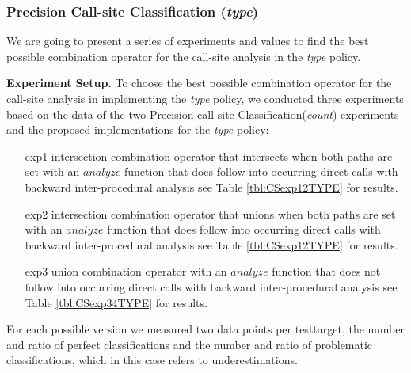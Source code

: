 %	
%
%
%
\newpage
\subsubsection{Precision Call-site Classification (\textit{type})}
\label{subsection:typeshieldprecision}
We are going to present a series of experiments and values to find the best possible combination operator for the call-site analysis in the \textit{type} policy.

\textbf{Experiment Setup.}
To choose the best possible combination operator for the call-site analysis in implementing the \textit{type} policy, we conducted three  experiments based on the data of the two Precision call-site Classification(\textit{count}) experiments and the proposed implementations for the \textit{type} policy:
\begin{itemize}
\item[exp1] intersection combination operator that intersects when both paths are set with an $analyze$ function that does follow into occurring direct calls with backward inter-procedural analysis see Table \ref{tbl:CSexp12TYPE} for results.

\item[exp2] intersection combination operator that unions when both paths are set with an $analyze$ function that does follow into occurring direct calls  with backward inter-procedural analysis  see Table \ref{tbl:CSexp12TYPE} for results.

\item[exp3] union combination operator with an $analyze$ function that does not follow into occurring direct calls  with backward inter-procedural analysis  see Table \ref{tbl:CSexp34TYPE} for results.

\end{itemize}
For each possible version we measured two data points per testtarget, the number and ratio of perfect classifications and the number and ratio of problematic classifications, which in this case refers to underestimations.

